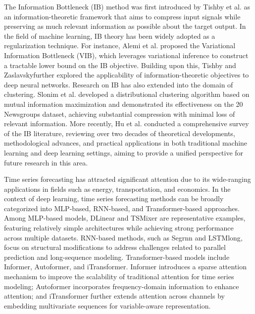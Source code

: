 \documentclass{article}
\begin{document}
The Information Bottleneck (IB) method was first introduced by Tishby et al. \cite{tishby2000informationbottleneckmethod} as an information-theoretic framework that aims to compress input signals while preserving as much relevant information as possible about the target output. In the field of machine learning, IB theory has been widely adopted as a regularization technique. For instance, Alemi et al.\cite{alemi2019deepvariationalinformationbottleneck} proposed the Variational Information Bottleneck (VIB), which leverages variational inference to construct a tractable lower bound on the IB objective. Building upon this, Tishby and Zaslavsky\cite{deep_learning_information_bottleneck}further explored the applicability of information-theoretic objectives to deep neural networks. Research on IB has also extended into the domain of clustering. Slonim et al.\cite{slonim1999agglomerative} developed a distributional clustering algorithm based on mutual information maximization and demonstrated its effectiveness on the 20 Newsgroups dataset, achieving substantial compression with minimal loss of relevant information. More recently, Hu et al.\cite{hu2024survey} conducted a comprehensive survey of the IB literature, reviewing over two decades of theoretical developments, methodological advances, and practical applications in both traditional machine learning and deep learning settings, aiming to provide a unified perspective for future research in this area.

Time series forecasting has attracted significant attention due to its wide-ranging applications in fields such as energy, transportation, and economics. In the context of deep learning, time series forecasting methods can be broadly categorized into MLP-based, RNN-based, and Transformer-based approaches. Among MLP-based models, DLinear\cite{DLinear} and TSMixer\cite{tsmixer} are representative examples, featuring relatively simple architectures while achieving strong performance across multiple datasets. RNN-based methods, such as Segrnn\cite{tactis} and LSTMlong\cite{lstmlong}, focus on structural modifications to address challenges related to parallel prediction and long-sequence modeling. Transformer-based models include Informer\cite{informer}, Autoformer\cite{autotransformer}, and iTransformer\cite{itransformer}. Informer introduces a sparse attention mechanism to improve the scalability of traditional attention for time series modeling; Autoformer incorporates frequency-domain information to enhance attention; and iTransformer further extends attention across channels by embedding multivariate sequences for variable-aware representation.
\end{document}
